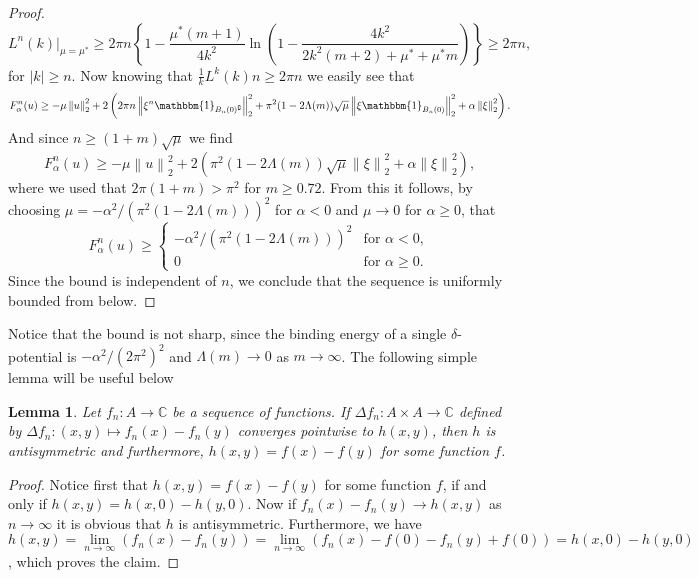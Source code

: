 \documentclass[a4paper,11pt]{article}
\newcommand{\norm}[1]{\left\lVert #1 \right\rVert}
\newcommand{\abs}[1]{\left\lvert #1 \right\rvert}
\newcommand{\C}{\mathbb{C}}
\newtheorem{lemma}{Lemma}
\numberwithin{equation}{section}
\begin{document}
\begin{proof}
\begin{equation}
		L^n(k)\rvert_{\mu=\mu^*}\geq2\pi n\left\{1 -\frac{ \mu^*  (m+1)}{4 k^2} \ln \left(1-\frac{4 k^2}{2 k^2 (m+2)+\mu^* +\mu^*  m}\right)\right\}\geq2\pi n,
		\end{equation}
		for $ \abs{k}\geq n $. Now knowing that $ \frac{1}{k}L^k(k)n\geq2\pi n $ we easily see that \begin{equation}
		F^n_\alpha(u)\geq-\mu\norm{u}_2^2+2\left(2\pi n \norm{\xi^n\mathbbm{1}_{B_n(0)^\complement}}_2^2+\pi^2(1-2\Lambda(m))\sqrt{\mu}\norm{\xi\mathbbm{1}_{B_n(0)}}_2^2+\alpha\norm{\xi}_2^2\right).
		\end{equation}
		And since $ n\geq(1+m)\sqrt{\mu} $ we find \begin{equation}
		F^n_\alpha(u)\geq-\mu\norm{u}_2^2+2\left(\pi^2(1-2\Lambda(m))\sqrt{\mu}\norm{\xi}_2^2+\alpha\norm{\xi}_2^2\right),
		\end{equation}
		where we used that $ 2\pi(1+m)>\pi^2 $ for $ m\geq0.72 $.
		From this it follows, by choosing $ \mu=-\alpha^2/(\pi^2(1-2\Lambda(m)))^{2} $ for $ \alpha<0 $ and $ \mu\to0 $ for $ \alpha\geq0 $, that \begin{equation}
		F^n_\alpha(u)\geq\begin{cases}
		-\alpha^2/(\pi^2(1-2\Lambda(m)))^{2}&\text{for }\alpha<0,\\
		0&\text{for }\alpha\geq0.
		\end{cases}
		\end{equation}
		Since the bound is independent of $ n $, we conclude that the sequence is uniformly bounded from below.
	\end{proof}
	Notice that the bound is not sharp, since the binding energy of a single $\delta$-potential is $ -\alpha^2/(2\pi^2)^2 $ and $ \Lambda(m)\to0 $ as $ m\to\infty $. 
	The following simple lemma will be useful below\begin{lemma}\label{lemmaAntisymmetricConvergence}
		Let $ f_n :A\to \C $ be a sequence of functions. If $ \Delta f_n:A\times A\to \C $ defined by $ \Delta f_n:(x,y)\mapsto f_n(x)-f_n(y) $ converges pointwise to $ h(x,y) $, then $ h $ is antisymmetric and furthermore, $ h(x,y)=f(x)-f(y) $ for some function $ f $.
	\end{lemma}
	\begin{proof}
		Notice first that $ h(x,y)=f(x)-f(y) $ for some function $ f $, if and only if $ h(x,y)=h(x,0)-h(y,0) $. Now if $ f_n(x)-f_n(y)\to h(x,y) $ as $ n\to\infty $ it is obvious that $ h $ is antisymmetric. Furthermore, we have $ h(x,y)=\lim\limits_{n\to\infty}\left(f_n(x)-f_n(y)\right)=\lim\limits_{n\to\infty}\left(f_n(x)-f(0)-f_n(y)+f(0)\right)=h(x,0)-h(y,0) $, which proves the claim.
	\end{proof}
\end{document}
